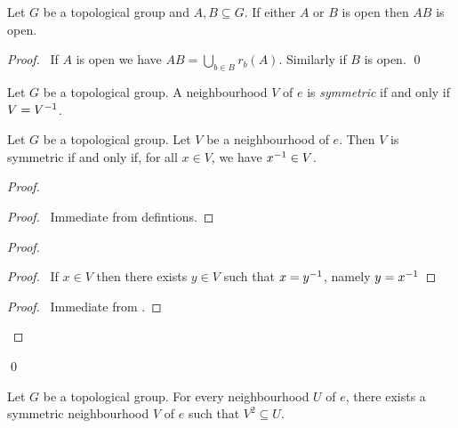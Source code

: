 \begin{lemma}
    \label{lemma:open_subset_mult}
    Let $G$ be a topological group and $A, B \subseteq G$. If either $A$ or $B$ is open then $AB$ is open.
\end{lemma}

\begin{proof}
    \pf\ If $A$ is open we have $AB = \bigcup_{b \in B} r_b(A)$. Similarly if $B$ is open. \qed
\end{proof}

\begin{definition}
    Let $G$ be a topological group. A neighbourhood $V$ of $e$ is \emph{symmetric}
    if and only if $V = {V}^{-1}$.
\end{definition}

\begin{lemma}
    \label{lemma:symmetric_neighbourhood}
    Let $G$ be a topological group. Let $V$ be a neighbourhood of $e$. Then $V$ is symmetric if and only if, for all $x \in V$, we have ${x}^{-1} \in V$.
\end{lemma}

\begin{proof}
    \pf
    \begin{proof}
        \pf\ Immediate from defintions.
    \end{proof}
    \begin{proof}
        \begin{proof}
            \pf\ If $x \in V$ then there exists $y \in V$ such that $x = {y}^{-1}$, namely $y = {x}^{-1}$
        \end{proof}
        \begin{proof}
            \pf\ Immediate from .
        \end{proof}
    \end{proof}
    \qed
\end{proof}

\begin{lemma}
    \label{lemma:symmetric_subneighbourhood}
    Let $G$ be a topological group. For every neighbourhood $U$ of $e$, there exists a symmetric neighbourhood $V$ of $e$ such that $V^2 \subseteq U$.
\end{lemma}

